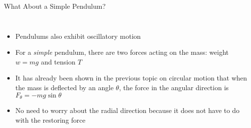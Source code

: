 \documentclass[12pt,compress,aspectratio=169]{beamer}
\begin{document}
\begin{frame}{What About a Simple Pendulum?}
  \begin{columns}
    \begin{itemize}
    \item Pendulums also exhibit oscillatory motion
    \item For a \emph{simple} pendulum, there are two forces acting on the
      mass: weight $w=mg$ and tension $T$
    \item It has already been shown in the previous topic on circular motion
      that when the mass is deflected by an angle $\theta$, the force in the
      angular direction is $F_\theta=-mg\sin\theta$
    \item No need to worry about the radial direction because it does not
      have to do with the restoring force
    \end{itemize}

  \end{columns}
\end{frame}
\end{document}
